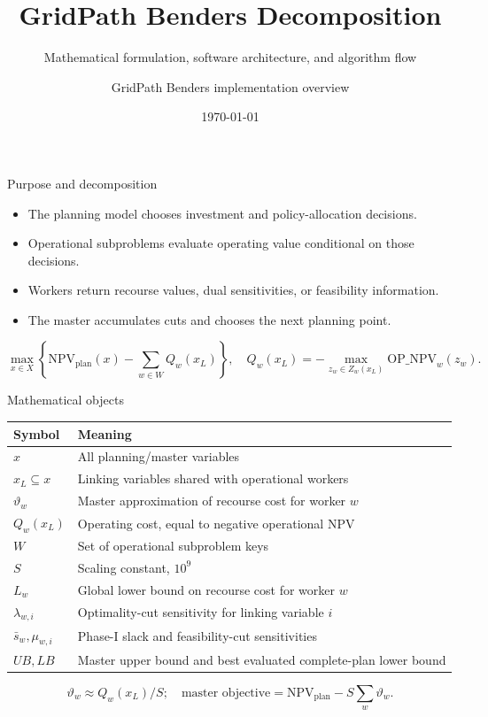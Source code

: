 \documentclass[aspectratio=169,10pt]{beamer}
\title[GridPath Benders]{GridPath Benders Decomposition}
\subtitle{Mathematical formulation, software architecture, and algorithm flow}
\author{GridPath Benders implementation overview}
\date{\today}
\begin{document}
\begin{frame}\titlepage\end{frame}

\begin{frame}{Purpose and decomposition}
\begin{itemize}
\item The planning model chooses investment and policy-allocation decisions.
\item Operational subproblems evaluate operating value conditional on those decisions.
\item Workers return recourse values, dual sensitivities, or feasibility information.
\item The master accumulates cuts and chooses the next planning point.
\end{itemize}
\[
\max_{x\in X}\left\{\mathrm{NPV}_{\mathrm{plan}}(x)-\sum_{w\in W}Q_w(x_L)\right\},
\quad Q_w(x_L)=-\max_{z_w\in Z_w(x_L)}\mathrm{OP\_NPV}_w(z_w).
\]
\end{frame}

\begin{frame}{Mathematical objects}
\small
\begin{tabular}{@{}ll@{}}
\toprule Symbol & Meaning\\\midrule
$x$ & All planning/master variables\\
$x_L\subseteq x$ & Linking variables shared with operational workers\\
$\vartheta_w$ & Master approximation of recourse cost for worker $w$\\
$Q_w(x_L)$ & Operating cost, equal to negative operational NPV\\
$W$ & Set of operational subproblem keys\\
$S$ & Scaling constant, $10^9$\\
$L_w$ & Global lower bound on recourse cost for worker $w$\\
$\lambda_{w,i}$ & Optimality-cut sensitivity for linking variable $i$\\
$\bar{s}_w,\mu_{w,i}$ & Phase-I slack and feasibility-cut sensitivities\\
$UB,LB$ & Master upper bound and best evaluated complete-plan lower bound\\
\bottomrule
\end{tabular}
\[
\vartheta_w\approx Q_w(x_L)/S;\quad
\text{master objective}=\mathrm{NPV}_{\mathrm{plan}}-S\sum_w\vartheta_w.
\]
\end{frame}
\end{document}
